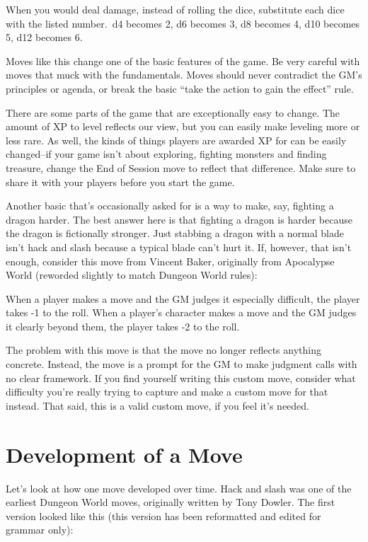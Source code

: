  When you would deal damage, instead of rolling the dice, substitute each dice with the listed number.\ d4 becomes 2, d6 becomes 3, d8 becomes 4, d10 becomes 5, d12 becomes 6.


 Moves like this change one of the basic features of the game. Be very careful with moves that muck with the fundamentals. Moves should never contradict the GM's principles or agenda, or break the basic ``take the action to gain the effect'' rule.


 There are some parts of the game that are exceptionally easy to change. The amount of XP to level reflects our view, but you can easily make leveling more or less rare. As well, the kinds of things players are awarded XP for can be easily changed--if your game isn't about exploring, fighting monsters and finding treasure, change the End of Session move to reflect that difference. Make sure to share it with your players before you start the game.


 Another basic that's occasionally asked for is a way to make, say, fighting a dragon harder. The best answer here is that fighting a dragon is harder because the dragon is fictionally stronger. Just stabbing a dragon with a normal blade isn't hack and slash because a typical blade can't hurt it. If, however, that isn't enough, consider this move from Vincent Baker, originally from Apocalypse World (reworded slightly to match Dungeon World rules):


 When a player makes a move and the GM judges it especially difficult, the player takes -1 to the roll. When a player's character makes a move and the GM judges it clearly beyond them, the player takes -2 to the roll.


 The problem with this move is that the move no longer reflects anything concrete. Instead, the move is a prompt for the GM to make judgment calls with no clear framework. If you find yourself writing this custom move, consider what difficulty you're really trying to capture and make a custom move for that instead. That said, this is a valid custom move, if you feel it's needed.
\section*{Development of a Move}


 Let's look at how one move developed over time. Hack and slash was one of the earliest Dungeon World moves, originally written by Tony Dowler. The first version looked like this (this version has been reformatted and edited for grammar only):


